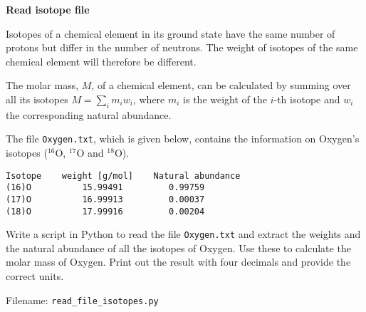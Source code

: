\begin{Problem}{\textbf{Read isotope file}}

\noindent
Isotopes of a chemical element in its ground state have the same number of protons but differ in the number of neutrons. The weight of isotopes of the same chemical element will therefore be different.

The molar mass, $M$, of a chemical element, can be calculated by summing over all its isotopes $ M =  \sum_{i} m_i w_i $, where $m_i$ is the weight of the $i$-th isotope and $w_i$ the corresponding natural abundance.

The file \texttt{Oxygen.txt}, which is given below, contains the information on Oxygen's isotopes ($\mathrm{^{16}O}$, $\mathrm{^{17}O}$ and $\mathrm{^{18}O}$).
\begin{lstlisting}
Isotope    weight [g/mol]    Natural abundance
(16)O          15.99491         0.99759
(17)O          16.99913         0.00037
(18)O          17.99916         0.00204
\end{lstlisting}

Write a script in Python to read the file \texttt{Oxygen.txt} and extract the weights and the natural abundance of all the isotopes of Oxygen. Use these to calculate the molar mass of Oxygen. Print out the result with four decimals and provide the correct units.

Filename: \texttt{read\_file\_isotopes.py}
\end{Problem}

